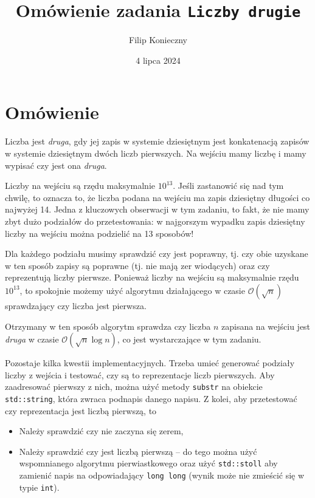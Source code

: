 \documentclass[]{article}
\author{Filip Konieczny}
\date{4 lipca 2024}
\title{Omówienie zadania \texttt{Liczby drugie}}
\newcommand{\Oh}[1]{\mathcal{O}{\left(#1\right)}}
\begin{document}
\maketitle
\section{Omówienie}

Liczba jest \textit{druga}, gdy jej zapis w systemie dziesiętnym jest konkatenacją zapisów w systemie dziesiętnym dwóch liczb pierwszych. Na wejściu mamy liczbę i mamy wypisać czy jest ona \textit{druga}.

Liczby na wejściu są rzędu maksymalnie $10^{13}$. Jeśli zastanowić się nad tym chwilę, to oznacza to, że liczba podana na wejściu ma zapis dziesiętny długości co najwyżej 14. Jedna z kluczowych obserwacji w tym zadaniu, to fakt, że nie mamy zbyt dużo podziałów do przetestowania: w najgorszym wypadku zapis dziesiętny liczby na wejściu można podzielić na 13 sposobów!

Dla każdego podziału musimy sprawdzić czy jest poprawny, tj. czy obie uzyskane w ten sposób zapisy są poprawne (tj. nie mają zer wiodących) oraz czy reprezentują liczby pierwsze. Ponieważ liczby na wejściu są maksymalnie rzędu $10^{13}$, to spokojnie możemy użyć algorytmu działającego w czasie $\Oh{\sqrt{n}}$ sprawdzający czy liczba jest pierwsza.

Otrzymany w ten sposób algorytm sprawdza czy liczba $n$ zapisana na wejściu jest \textit{druga} w czasie $\Oh{\sqrt{n}\log{n}}$, co jest wystarczające w tym zadaniu.

Pozostaje kilka kwestii implementacyjnych. Trzeba umieć generować podziały liczby z wejścia i testować, czy są to reprezentacje liczb pierwszych. Aby zaadresować pierwszy z nich, można użyć metody \texttt{substr} na obiekcie \texttt{std::string}, która zwraca podnapis danego napisu. Z kolei, aby przetestować czy reprezentacja jest liczbą pierwszą, to 

\begin{itemize}
    \item Należy sprawdzić czy nie zaczyna się zerem,
    \item Należy sprawdzić czy jest liczbą pierwszą -- do tego można użyć wspomnianego algorytmu pierwiastkowego oraz użyć \texttt{std::stoll} aby zamienić napis na odpowiadający \texttt{long long} (wynik może nie zmieścić się w typie \texttt{int}).
\end{itemize}
\end{document}

